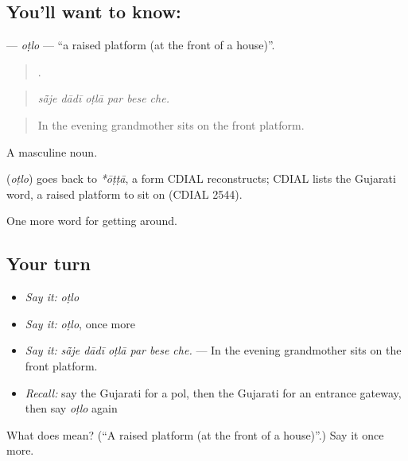 \subsection*{You'll want to know: }
\textbf{} — \emph{oṭlo} — \textquotedblleft{}a raised platform (at the front of a house)\textquotedblright{}.

\begin{quote}
     .
\end{quote}

\begin{quote}
\emph{sā̃je dādī oṭlā par bese che.}
\end{quote}

\begin{quote}
In the evening grandmother sits on the front platform.
\end{quote}

A masculine noun.

\begin{cousinweb}
\textbf{} (\emph{oṭlo}) goes back to \emph{*ōṭṭā}, a form CDIAL reconstructs; CDIAL lists the Gujarati word, a raised platform to sit on (CDIAL 2544).
\end{cousinweb}

\begin{grammarlens}[title={What you've built}]
One more word for getting around.
\end{grammarlens}

\subsection*{Your turn}
\begin{itemize}
\raggedright
  \item \emph{Say it:} \emph{oṭlo}
  \item \emph{Say it:} \emph{oṭlo}, once more
  \item \emph{Say it:} \emph{sā̃je dādī oṭlā par bese che.} — In the evening grandmother sits on the front platform.
  \item \emph{Recall:} say the Gujarati for a pol, then the Gujarati for an entrance gateway, then say \emph{oṭlo} again
\end{itemize}

\begin{tcolorbox}[breakable,colback=teal!4,colframe=teal!35!black,title={Before you move on}]
What does  mean? (\textquotedblleft{}A raised platform (at the front of a house)\textquotedblright{}.) Say it once more.
\end{tcolorbox}
